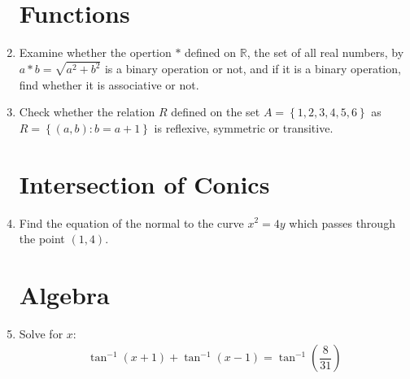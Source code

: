 \documentclass[2pt,-letter paper]{article}
\providecommand{\cbrak}[1]{\ensuremath{\left\{#1\right\}}}
\providecommand{\brak}[1]{\ensuremath{\left(#1\right)}}
\begin{document}
\begin{enumerate}
\section{Functions}
\item Examine whether the opertion $\ast$ defined on $\mathbb{R}$, the set of all real numbers, by $a\ast b=\sqrt{a^2+b^2}$ is a binary operation or not, and if it is a binary operation, find whether it is associative or not.
\item Check whether the relation $R$ defined on the set $A=\cbrak{1,2,3,4,5,6}$ as $R =\cbrak {(a, b) : b = a + 1}$ is reflexive, symmetric or transitive.
\section{Intersection of Conics}
\item Find the equation of the normal to the curve $x^2 = 4y$ which passes through the point $\brak{1,4}$.
\section{Algebra}
\item Solve for $x$:
	\begin{align*}
	\tan^{-1}\brak{x+1}+\tan^{-1}\brak{x-1}=\tan^{-1}\brak{\dfrac{8}{31}}
	\end{align*}


\end{enumerate}
\end{document}
